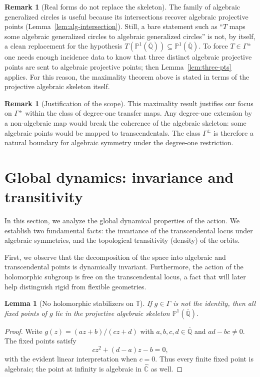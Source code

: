 \documentclass[11pt,a4paper]{article}
\theoremstyle{plain}
\newtheorem{lemma}[theorem]{Lemma}
\theoremstyle{definition}
\newtheorem{remark}[theorem]{Remark}
\newcommand{\rsphere}{\hat{\mathbb{C}}}
\newcommand{\Alg}{\overline{\mathbb{Q}}}
\newcommand{\PAlg}{\mathbb{P}^{1}(\Alg)}
\newcommand{\trans}{\mathbb{T}}
\newcommand{\Tc}{\trans}
\begin{document}
\begin{remark}[Real forms do not replace the skeleton]\label{rem:real-forms-skeleton}
	The family of algebraic generalized circles is useful because its intersections recover algebraic projective points (Lemma~\ref{lem:alg-intersection}). Still, a bare statement such as ``$T$ maps some algebraic generalized circles to algebraic generalized circles'' is not, by itself, a clean replacement for the hypothesis $T(\PAlg)\subseteq\PAlg$. To force $T\in\Gamma^{\pm}$ one needs enough incidence data to know that three distinct algebraic projective points are sent to algebraic projective points; then Lemma~\ref{lem:three-pts} applies. For this reason, the maximality theorem above is stated in terms of the projective algebraic skeleton itself.
\end{remark}

\begin{remark}[Justification of the scope]\label{rem:why-g}
	This maximality result justifies our focus on $\Gamma^{\pm}$ within the class of degree-one transfer maps. Any degree-one extension by a non-algebraic map would break the coherence of the algebraic skeleton: some algebraic points would be mapped to transcendentals. The class $\Gamma^{\pm}$ is therefore a natural boundary for algebraic symmetry under the degree-one restriction.
\end{remark}

\section{Global dynamics: invariance and transitivity}\label{sec:group-actions}

In this section, we analyze the global dynamical properties of the action. We establish two fundamental facts: the invariance of the transcendental locus under algebraic symmetries, and the topological transitivity (density) of the orbits.

First, we observe that the decomposition of the space into algebraic and transcendental points is dynamically invariant. Furthermore, the action of the holomorphic subgroup is free on the transcendental locus, a fact that will later help distinguish rigid from flexible geometries.

\begin{lemma}[No holomorphic stabilizers on $\Tc$]\label{lem:no-holo-stab}
	If $g\in\Gamma$ is not the identity, then all fixed points of $g$ lie in the projective algebraic skeleton $\PAlg$.
\end{lemma}
\begin{proof}
	Write $g(z)=(az+b)/(cz+d)$ with $a,b,c,d\in\Alg$ and $ad-bc\ne0$. The fixed points satisfy
	\[
		cz^2+(d-a)z-b=0,
	\]
	with the evident linear interpretation when $c=0$. Thus every finite fixed point is algebraic; the point at infinity is algebraic in $\rsphere$ as well.
\end{proof}
\end{document}
